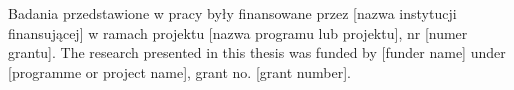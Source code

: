 \cleardoublepage
\chapter*{}
{}

\ploren
  {Badania przedstawione w pracy były finansowane przez [nazwa instytucji finansującej] w ramach projektu [nazwa programu lub projektu], nr [numer grantu].}
  {The research presented in this thesis was funded by [funder name] under [programme or project name], grant no. [grant number].}

